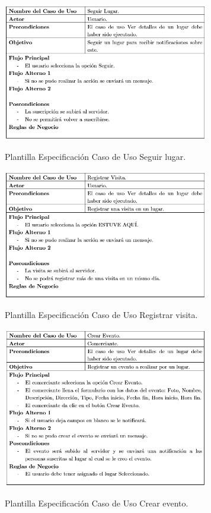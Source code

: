 \documentclass[12pt,letterpaper,openany]{book}
\begin{document}
\begin{table}[H]
\centering
\includegraphics[width=9cm]{./imagenes/PCU/seguir_lugar}
\caption{Plantilla Especificación Caso de Uso Seguir lugar.}
\end{table}

\begin{table}[H]
\centering
\includegraphics[width=9cm]{./imagenes/PCU/registrar_visita}
\caption{Plantilla Especificación Caso de Uso Registrar visita.}
\end{table}

\begin{table}[H]
\centering
\includegraphics[width=9cm]{./imagenes/PCU/crear_evento}
\caption{Plantilla Especificación Caso de Uso Crear evento.}
\end{table}
\end{document}
